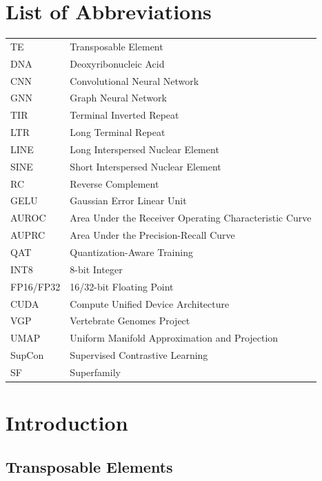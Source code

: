 \documentclass[12pt]{article}
\begin{document}
\newpage
\tableofcontents

\newpage
\section*{List of Abbreviations}

\begin{tabular}{ll}
    TE & Transposable Element \\
    DNA & Deoxyribonucleic Acid \\
    CNN & Convolutional Neural Network \\
    GNN & Graph Neural Network \\
    TIR & Terminal Inverted Repeat \\
    LTR & Long Terminal Repeat \\
    LINE & Long Interspersed Nuclear Element \\
    SINE & Short Interspersed Nuclear Element \\
    RC & Reverse Complement \\
    GELU & Gaussian Error Linear Unit \\
    AUROC & Area Under the Receiver Operating Characteristic Curve \\
    AUPRC & Area Under the Precision-Recall Curve \\
    QAT & Quantization-Aware Training \\
    INT8 & 8-bit Integer \\
    FP16/FP32 & 16/32-bit Floating Point \\
    CUDA & Compute Unified Device Architecture \\
    VGP & Vertebrate Genomes Project \\
    UMAP & Uniform Manifold Approximation and Projection \\
    SupCon & Supervised Contrastive Learning \\
    SF & Superfamily \\
\end{tabular}


\newpage
\section{Introduction}

\subsection{Transposable Elements}
\end{document}
